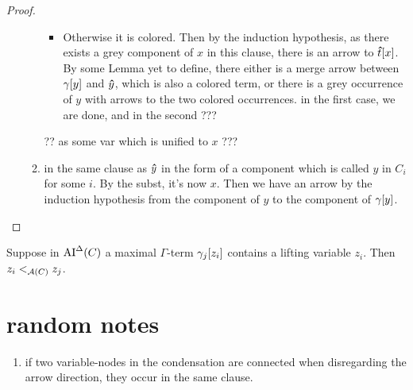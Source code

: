 \documentclass[,%
	paper=a4,%
	DIV10, %
	twoside=false,%
	liststotoc,
	bibtotoc,
	draft=false,%
	numbers=noendperiod
]{scrartcl}
\newcommand{\de}{^\Delta}
\begin{document}
\begin{proof}
\begin{enumerate}
\begin{enumerate}
\begin{itemize}
					\item Otherwise it is colored. Then by the induction hypothesis, as there exists a grey component of $x$ in this clause, there is an arrow to $\bm\hat t[x]$. By some Lemma yet to define, there either is a merge arrow between $\gamma[y]$ and $\bm\hat y$, which is also a colored term, or there is a grey occurrence of $y$ with arrows to the two colored occurrences. in the first case, we are done, and in the second ???










						\end{itemize}


						?? as some var which is unified to $x$ ???
					\item in the same clause as $\bm\hat y$ in the form of a component which is called $y$ in $C_i$ for some $i$.
						By the subst, it's now $x$.
						Then we have an arrow by the induction hypothesis from the component of $y$ to the component of $\gamma[y]$.


				\end{enumerate}

		\end{enumerate}

\end{proof}

\begin{conj}[Conjecture 4]
	Suppose in $\AI\de(C)$ a maximal $\Gamma$-term $\gamma_j[z_i]$ contains a lifting variable $z_i$. Then $z_i <_{\operatorname{\mathcal{A}}(C)} z_j$.
\end{conj}

\section*{random notes}
\begin{enumerate}
		\item
			if two variable-nodes in the condensation are connected when disregarding the arrow direction, they occur in the same clause.
\end{enumerate}
\end{document}
